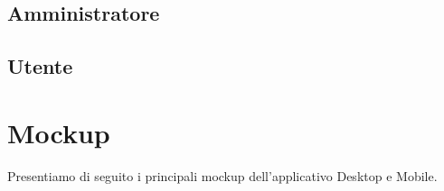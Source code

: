 \subsection{Amministratore}


\pagebreak



\pagebreak

\subsection{Utente}







\pagebreak
\section{Mockup}
Presentiamo di seguito i principali mockup dell'applicativo Desktop e Mobile.

